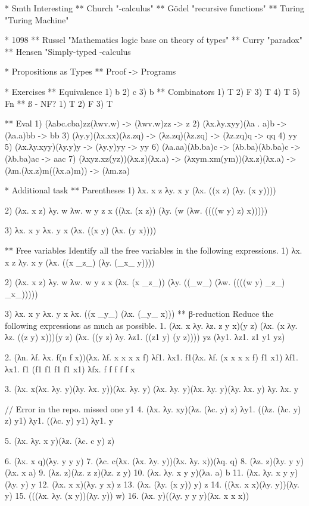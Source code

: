 * Smth Interesting
** Church "\lambda-calculus"
** Gödel "recursive functions"
** Turing "Turing Machine"

* 1098
** Russel "Mathematics logic base on theory of types"
** Curry "paradox"
** Hensen "Simply-typed \lambda-calculus

* Propositions as Types
** Proof -> Programs

* Exercises
** Equivalence
1) b
2) c
3) b
** Combinators
1) T
2) F
3) T
4) T
5) Fn
** ß - NF?
1) T
2) F
3) T

** Eval
1) (λabc.cba)zz(λwv.w) -> (λwv.w)zz -> z
2) (λx.λy.xyy)(λa . a)b -> (λa.a)bb -> bb
3) (λy.y)(λx.xx)(λz.zq) -> (λz.zq)(λz.zq) -> (λz.zq)q -> qq
4) yy
5) (λx.λy.xyy)(λy.y)y -> (λy.y)yy -> yy
6) (λa.aa)(λb.ba)c -> (λb.ba)(λb.ba)c -> (λb.ba)ac -> aac
7) (λxyz.xz(yz))(λx.z)(λx.a) -> (λxym.xm(ym))(λx.z)(λx.a) ->
   (λm.(λx.z)m((λx.a)m)) ->
   (λm.za)

* Additional task
** Parentheses
   1) λx. x z λy. x y
      (λx. ((x z) (λy. (x y))))

   2) (λx. x z) λy. w λw. w y z x
      ((λx. (x z)) (λy. (w (λw. ((((w y) z) x)))))

   3) λx. x y λx. y x
      (λx. ((x y) (λx. (y x))))

** Free variables
   Identify all the free variables in the following expressions.
   1) λx. x z λy. x y
      (λx. ((x _z_) (λy. (_x_ y))))

   2) (λx. x z) λy. w λw. w y z x
      (λx. (x _z_)) (λy. ((_w_) (λw. ((((w y) _z_) _x_)))))

   3) λx. x y λx. y x
      λx. ((x _y_) (λx. (_y_ x)))
** β-reduction
   Reduce the following expressions as much as possible.
   1. (λx. x λy. λz. z y x)(y z)
      (λx. (x λy. λz. ((z y) x)))(y z)
      (λx. ((y z) λy. λz1. ((z1 y) (y z))))
      yz (λy1. λz1. z1 y1 yz)

   2. (λn. λf. λx. f(n f x))(λx. λf. x x x x f)
      λf1. λx1. f1(λx. λf. (x x x x f) f1 x1)
      λf1. λx1. f1 (f1 f1 f1 f1 x1)
      λfx. f f f f f x

   3. (λx. x(λx. λy. y)(λy. λx. y))(λx. λy. y)
      (λx. λy. y)(λx. λy. y)(λy. λx. y)
      λy. λx. y

   // Error in the repo. missed one y1
   4. (λx. λy. xy)(λz. (λc. y) z)
      λy1. ((λz. (λc. y) z) y1)
      λy1. ((λc. y) y1)
      λy1. y

   5. (λx. λy. x y)(λz. (λc. c y) z)

   6. (λx. x q)(λy. y y y)
   7. (λc. c(λx. (λx. λy. y))(λx. λy. x))(λq. q)
   8. (λz. z)(λy. y y)(λx. x a)
   9. (λz. z)(λz. z z)(λz. z y)
   10. (λx. λy. x y y)(λa. a) b
   11. (λx. λy. x y y)(λy. y) y
   12. (λx. x x)(λy. y x) z
   13. (λx. (λy. (x y)) y) z
   14. ((λx. x x)(λy. y))(λy. y)
   15. (((λx. λy. (x y))(λy. y)) w)
   16. (λx. y)((λy. y y y)(λx. x x x))
